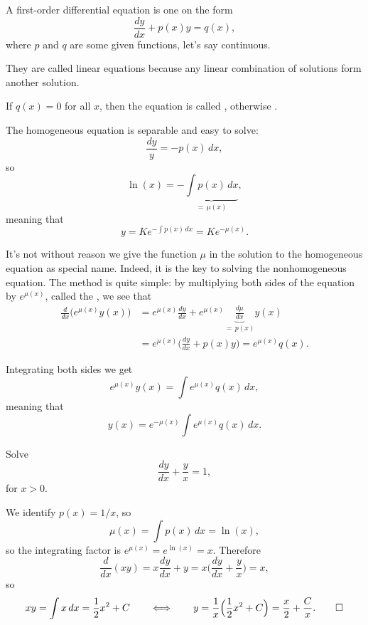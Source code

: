 
A first-order  differential equation is one on the form
\[
	\frac{d y}{d x} + p(x) y = q(x),
\]
where $p$ and $q$ are some given functions, let's say continuous.

They are called linear equations because any linear combination of solutions form another solution.

If $q(x) = 0$ for all $x$, then the equation is called , otherwise .

The homogeneous equation is separable and easy to solve:
\[
	\frac{d y}{y} = - p(x) \, d x,
\]
so
\[
	\ln(x) = - \underbrace{\int p(x) \, d x}_{=\, \mu(x)},
\]
meaning that
\[
	y = K e^{- \int p(x) \, d x} = K e^{-\mu(x)}.
\]

\noindent
It's not without reason we give the function $\mu$ in the solution to the homogeneous equation as special name.
Indeed, it is the key to solving the nonhomogeneous equation.
The method is quite simple: by multiplying both sides of the equation by $e^{\mu(x)}$, called the , we see that
\begin{align*}
	\frac{d}{d x} \big ( e^{\mu(x)} y(x) \big ) &= e^{\mu(x)} \frac{d y}{d x} + e^{\mu(x)} \underbrace{\frac{d \mu}{d x}}_{=\, p(x)} y(x) \\
	                                            &= e^{\mu(x)} \Big ( \frac{d y}{d x} + p(x) y \Big ) = e^{\mu(x)} q(x).
\end{align*}

\noindent
Integrating both sides we get
\[
	e^{\mu(x)} y(x) = \int e^{\mu(x)} q(x) \, d x,
\]
meaning that
\[
	y(x) = e^{-\mu(x)} \int e^{\mu(x)} q(x) \, d x.
\]

\begin{example}
	Solve
	\[
		\frac{d y}{d x} + \frac{y}{x} = 1,
	\]
	for $x > 0$.

	We identify $p(x) = 1/x$, so
	\[
		\mu(x) = \int p(x) \, d x = \ln(x),
	\]
	so the integrating factor is $e^{\mu(x)} = e^{\ln(x)} = x$.
	Therefore
	\[
		\frac{d}{d x} (x y) = x \frac{d y}{d x} + y = x \Big ( \frac{d y}{d x} + \frac{y}{x} \Big ) = x,
	\]
	so
	\[
		x y = \int x \, d x = \frac{1}{2} x^2 + C \qquad \Longleftrightarrow \qquad y = \frac{1}{x} \Big ( \frac{1}{2} x^2 + C \Big ) = \frac{x}{2} + \frac{C}{x}. \qedhere
	\]
\end{example}

